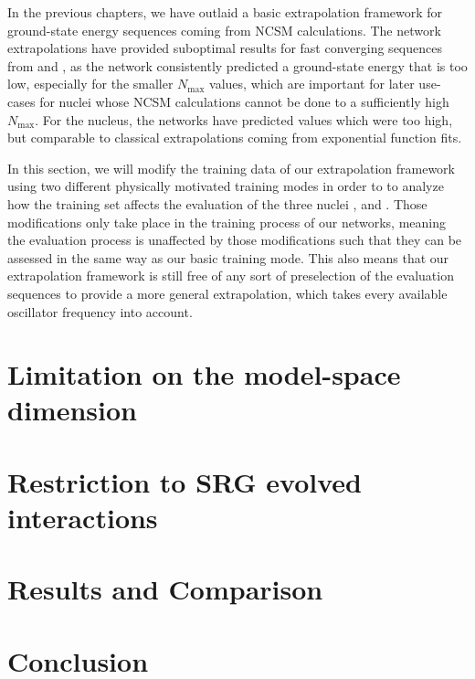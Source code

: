 In the previous chapters, we have outlaid a basic extrapolation framework for ground-state energy sequences coming from NCSM calculations. The network extrapolations have provided suboptimal results for fast converging sequences from  and , as the network consistently predicted a ground-state energy that is too low, especially for the smaller $N_\mathrm{max}$ values, which are important for later use-cases for nuclei whose NCSM calculations cannot be done to a sufficiently high $N_\mathrm{max}$. For the  nucleus, the networks have predicted values which were too high, but comparable to classical extrapolations coming from exponential function fits.

In this section, we will modify the training data of our extrapolation framework using two different physically motivated training modes in order to to analyze how the training set affects the evaluation of the three nuclei ,  and . Those modifications only take place in the training process of our networks, meaning the evaluation process is unaffected by those modifications such that they can be assessed in the same way as our basic training mode. This also means that our extrapolation framework is still free of any sort of preselection of the evaluation sequences to provide a more general extrapolation, which takes every available oscillator frequency into account.
\section{Limitation on the model-space dimension}

\section{Restriction to SRG evolved interactions}

\section{Results and Comparison}

\section{Conclusion}

